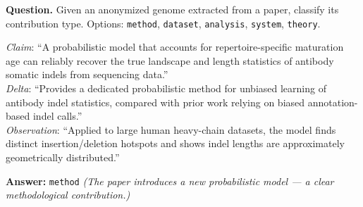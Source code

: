 \begin{tcolorbox}[
    breakable,
    title={Example of T1 · Genome Abstraction (T1-01: Contribution Role)},
    colback=LighterGray,
    colframe=DeepPurple,
    colbacktitle=DeepPurple,
    coltitle=White,
]
\textbf{\textcolor{CaseOrange}{Question.}} Given an anonymized genome extracted from a paper, classify its contribution type.
Options: \texttt{method}, \texttt{dataset}, \texttt{analysis}, \texttt{system}, \texttt{theory}.

\medskip
\textit{Claim}: ``A probabilistic model that accounts for repertoire-specific maturation age can reliably recover the true landscape and length statistics of antibody somatic indels from sequencing data.''\\
\textit{Delta}: ``Provides a dedicated probabilistic method for unbiased learning of antibody indel statistics, compared with prior work relying on biased annotation-based indel calls.''\\
\textit{Observation}: ``Applied to large human heavy-chain datasets, the model finds distinct insertion/deletion hotspots and shows indel lengths are approximately geometrically distributed.''

\medskip
\textbf{\textcolor{CaseBlue}{Answer:}} \texttt{method} \quad
\textit{(The paper introduces a new probabilistic model — a clear methodological contribution.)}
\end{tcolorbox}

\bigskip

